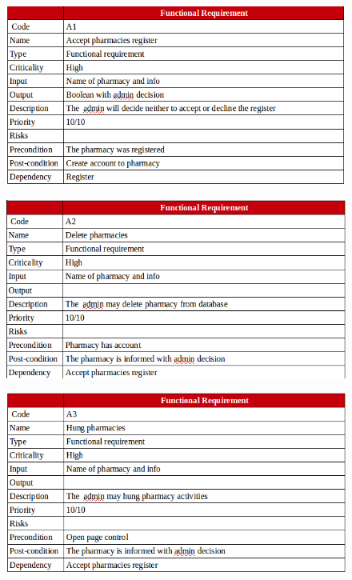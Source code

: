 \documentclass[]{article}
\begin{document}
\begin{figure}[H]
\centering
\includegraphics[scale=0.4]{./f/09}
\end{figure}

\begin{figure}[H]
\centering
\includegraphics[scale=0.4]{./f/10}
\end{figure}

\begin{figure}[H]
\centering
\includegraphics[scale=0.4]{./f/11}
\end{figure}
\end{document}
